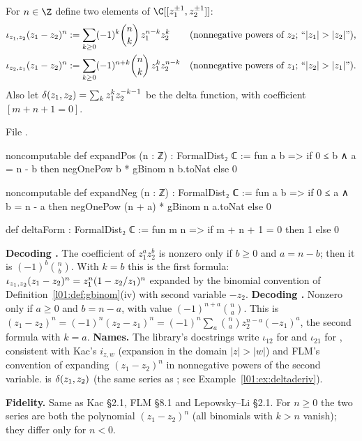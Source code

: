 \begin{definition}\label{l01:def:expand}
For $n\in\Z$ define two elements of $\C[[z_1^{\pm1},z_2^{\pm1}]]$:
\begin{align*}
  \loneiota{z_1}{z_2}(z_1-z_2)^n &:= \sum_{k\ge0}(-1)^k\binom nk\,z_1^{n-k}z_2^{k}
  &&\text{(nonnegative powers of $z_2$; ``$|z_1|>|z_2|$'')},\\
  \loneiota{z_2}{z_1}(z_1-z_2)^n &:= \sum_{k\ge0}(-1)^{n+k}\binom nk\,z_1^{k}z_2^{n-k}
  &&\text{(nonnegative powers of $z_1$; ``$|z_2|>|z_1|$'')}.
\end{align*}
Also let $\delta(z_1,z_2) = \sum_kz_1^kz_2^{-k-1}$ be the delta function, with coefficient $[m+n+1 = 0]$.
\end{definition}

\noindent File .
\begin{leancode}
noncomputable def expandPos (n : ℤ) : FormalDist₂ ℂ :=
  fun a b => if 0 ≤ b ∧ a = n - b then negOnePow b * gBinom n b.toNat else 0

noncomputable def expandNeg (n : ℤ) : FormalDist₂ ℂ :=
  fun a b => if 0 ≤ a ∧ b = n - a then negOnePow (n + a) * gBinom n a.toNat else 0

def deltaForm : FormalDist₂ ℂ := fun m n => if m + n + 1 = 0 then 1 else 0
\end{leancode}

\begin{dictionary}
\textbf{Decoding .} The coefficient of $z_1^az_2^b$ is nonzero only if $b\ge0$ and $a = n-b$; then
it is $(-1)^b\binom nb$. With $k = b$ this is the first formula: $\iota_{z_1,z_2}(z_1-z_2)^n = z_1^n(1-z_2/z_1)^n$
expanded by the binomial convention of Definition~\ref{l01:def:gbinom}(iv) with second variable $-z_2$.
\textbf{Decoding .} Nonzero only if $a\ge0$ and $b = n-a$, with value $(-1)^{n+a}\binom na$. This is
$(z_1-z_2)^n = (-1)^n(z_2-z_1)^n = (-1)^n\sum_a\binom na z_2^{n-a}(-z_1)^a$, the second formula with $k = a$.
\textbf{Names.} The library's docstrings write $\iota_{12}$ for  and $\iota_{21}$ for ,
consistent with Kac's $i_{z,w}$ (expansion in the domain $|z|>|w|$) and FLM's convention of expanding
$(z_1-z_2)^n$ in nonnegative powers of the second variable.  is $\delta(z_1,z_2)$ (the same series
as ; see Example~\ref{l01:ex:deltaderiv}).

\textbf{Fidelity.} Same as Kac §2.1, FLM §8.1 and Lepowsky--Li §2.1. For $n\ge0$ the two series
are both the polynomial $(z_1-z_2)^n$ (all binomials with $k>n$ vanish); they differ only for $n<0$.
\end{dictionary}

